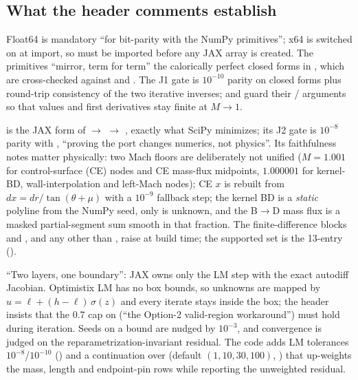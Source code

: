 \subsection{What the header comments establish}

 Float64 is mandatory ``for bit-parity with the NumPy primitives''; x64 is switched on at import, so  must be imported before any JAX array is created. The primitives ``mirror, term for term'' the calorically perfect closed forms in , which are cross-checked against  and . The J1 gate is $10^{-10}$ parity on closed forms plus round-trip consistency of the two iterative inverses;  and  guard their / arguments so that values and first derivatives stay finite at $M\to1$.

  is the JAX form of  $\rightarrow$  $\rightarrow$ , exactly what SciPy minimizes; its J2 gate is $10^{-8}$ parity with , ``proving the port changes numerics, not physics''. Its faithfulness notes matter physically: two Mach floors are deliberately not unified ($M=1.001$ for control-surface (CE) nodes and CE mass-flux midpoints, $1.000001$ for kernel-BD, wall-interpolation and left-Mach nodes); CE $x$ is rebuilt from $dx=dr/\tan(\theta+\mu)$ with a $10^{-9}$ fallback step; the kernel BD is a \emph{static} polyline from the NumPy seed, only  is unknown, and the B$\to$D mass flux is a masked partial-segment sum smooth in that fraction. The finite-difference blocks  and , and any  other than , raise at build time; the supported set is the 13-entry  ().

 ``Two layers, one boundary'': JAX owns only the LM step with the exact autodiff Jacobian. Optimistix LM has no box bounds, so unknowns are mapped by $u=\ell+(h-\ell)\,\sigma(z)$ and every iterate stays inside the box; the header insists that the 0.7 cap on  (``the Option-2 valid-region workaround'') must hold during iteration. Seeds on a bound are nudged by $10^{-3}$, and convergence is judged on the reparametrization-invariant residual. The code adds LM tolerances $10^{-8}$/$10^{-10}$ () and a continuation over  (default $(1,10,30,100)$, ) that up-weights the mass, length and endpoint-pin rows while reporting the unweighted residual.

